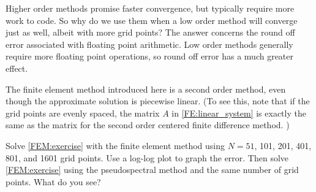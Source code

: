 \begin{problem}
	Higher order methods promise faster convergence, but typically require more work to code. So why do we use them when a low order method will converge just as well, albeit with more grid points? The answer concerns the round off error associated with floating point arithmetic. Low order methods generally require more floating point operations, so round off error has a much greater effect. 
	
The finite element method introduced here is a second order method, even though the approximate solution is piecewise linear. (To see this, note that if the grid points are evenly spaced, the matrix $A$ in \eqref{FE:linear_system} is exactly the same as the matrix for the second order centered finite difference method. )

Solve \eqref{FEM:exercise} with the finite element method using $N = 51$, 101, 201, 401, 801, and 1601 grid points. Use a log-log plot to graph the error. Then solve \eqref{FEM:exercise} using the pseudospectral method and the same number of grid points. What do you see? 
\end{problem}
% 




